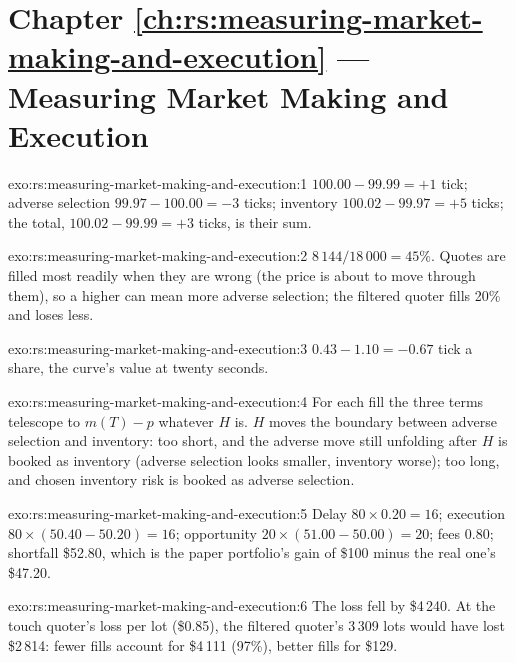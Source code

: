 \section*{Chapter \ref{ch:rs:measuring-market-making-and-execution} --- Measuring Market Making and Execution}

\begin{solution}{exo:rs:measuring-market-making-and-execution:1}
 $100.00 - 99.99 = +1$ tick; adverse selection $99.97 - 100.00 = -3$ ticks; inventory $100.02 - 99.97 = +5$ ticks; the total, $100.02 - 99.99 = +3$ ticks,
is their sum.
\end{solution}

\begin{solution}{exo:rs:measuring-market-making-and-execution:2}
$8\,144/18\,000 = 45\%$. Quotes are filled most readily when they are wrong (the price is about to move through them), so a higher  can mean more adverse
selection; the filtered quoter fills 20\% and loses less.
\end{solution}

\begin{solution}{exo:rs:measuring-market-making-and-execution:3}
$0.43 - 1.10 = -0.67$ tick a share, the curve's value at twenty seconds.
\end{solution}

\begin{solution}{exo:rs:measuring-market-making-and-execution:4}
For each fill the three terms telescope to $m(T) - p$ whatever $H$ is. $H$ moves the boundary between adverse selection and inventory: too short, and the adverse
move still unfolding after $H$ is booked as inventory (adverse selection looks smaller, inventory worse); too long, and chosen inventory risk is booked as adverse
selection.
\end{solution}

\begin{solution}{exo:rs:measuring-market-making-and-execution:5}
Delay $80 \times 0.20 = 16$; execution $80 \times (50.40 - 50.20) = 16$; opportunity $20 \times (51.00 - 50.00) = 20$; fees $0.80$; shortfall \$52.80, which is the paper
portfolio's gain of \$100 minus the real one's \$47.20.
\end{solution}

\begin{solution}{exo:rs:measuring-market-making-and-execution:6}
The loss fell by \$4\,240. At the touch quoter's loss per lot (\$0.85), the filtered quoter's 3\,309 lots would have lost \$2\,814: fewer fills account for \$4\,111
(97\%), better fills for \$129.
\end{solution}

